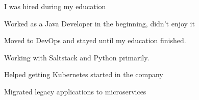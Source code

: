 \documentclass[]{cv}
\begin{document}
\begin{minipage}[t]{0.66\textwidth}
\begin{tightemize}
	\item I was hired during my education
	\item Worked as a Java Developer in the beginning, didn’t enjoy it
	\item Moved to DevOps and stayed until my education finished.
	\item Working with Saltstack and Python primarily.
	\item Helped getting Kubernetes started in the company
    \item Migrated legacy applications to microservices
\end{tightemize}
\sectionsep

\end{minipage} 
\end{document}

